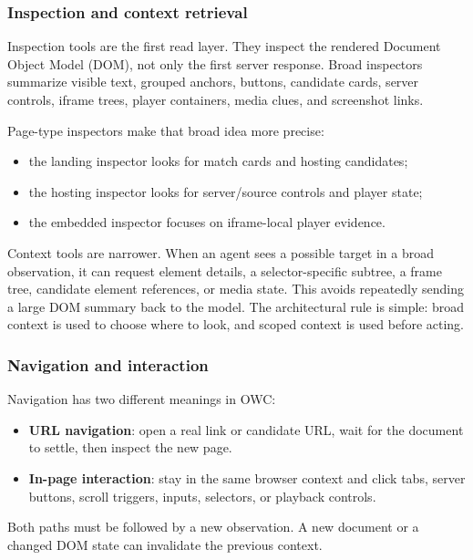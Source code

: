

\subsubsection{Inspection and context retrieval}

Inspection tools are the first read layer. They inspect the rendered Document Object
Model (DOM), not only the first server response. Broad inspectors summarize visible
text, grouped anchors, buttons, candidate cards, server controls, iframe trees, player
containers, media clues, and screenshot links.

Page-type inspectors make that broad idea more precise:
\begin{itemize}
  \item the landing inspector looks for match cards and hosting candidates;
  \item the hosting inspector looks for server/source controls and player state;
  \item the embedded inspector focuses on iframe-local player evidence.
\end{itemize}

Context tools are narrower. When an agent sees a possible target in a broad
observation, it can request element details, a selector-specific subtree, a frame
tree, candidate element references, or media state. This avoids repeatedly sending a
large DOM summary back to the model. The architectural rule is simple: broad context
is used to choose where to look, and scoped context is used before acting.



\subsubsection{Navigation and interaction}

Navigation has two different meanings in OWC\@:
\begin{itemize}
  \item \textbf{URL navigation}: open a real link or candidate URL, wait for the
  document to settle, then inspect the new page.
  \item \textbf{In-page interaction}: stay in the same browser context and click tabs,
  server buttons, scroll triggers, inputs, selectors, or playback controls.
\end{itemize}

Both paths must be followed by a new observation. A new document or a changed DOM state
can invalidate the previous context.


